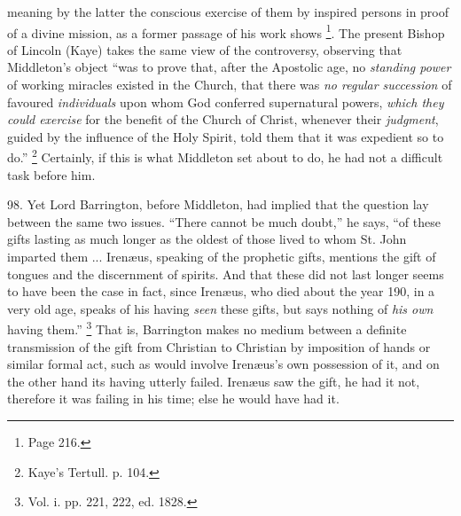 meaning by the latter the conscious exercise of them by inspired
persons in proof of a divine mission, as a former passage of his work
shows \footnote{Page 216.}. The present
Bishop of Lincoln (Kaye) takes the same view of the controversy,
observing that Middleton's object ``was to prove that, after the
Apostolic age, no \emph{standing power} of working miracles existed in
the Church, that there was \emph{no regular succession} of favoured \emph{individuals}
upon whom God conferred supernatural powers, \emph{which they could
exercise} for the benefit of the Church of Christ, whenever their \emph{judgment},
guided by the influence of the Holy Spirit, told them that it
was expedient so to do.'' \footnote{Kaye's Tertull. p. 104.}
Certainly, if this is what Middleton set about to do, he had not a
difficult task before him.

98.
Yet Lord Barrington, before Middleton, had implied that the question
lay between the same two issues. ``There cannot be much doubt,'' he
says, ``of these gifts lasting as much longer as the oldest of those
lived to whom St. John imparted them ... Irenæus, speaking of the
prophetic gifts, mentions the gift of tongues and the discernment of
spirits. And that these did not last longer seems to have been the
case in fact, since Irenæus, who died about the year 190, in a very
old age, speaks of his having \emph{seen} these gifts, but says
nothing of \emph{his own} having them.'' \footnote{Vol. i. pp. 221, 222, ed. 1828.} That is, Barrington makes no medium between a definite
transmission of the gift from Christian to Christian by imposition of
hands or similar formal act, such as would involve Irenæus's own
possession of it, and on the other hand its having utterly failed.
Irenæus saw the gift, he had it not, therefore it was failing in his
time; else he would have had it.

